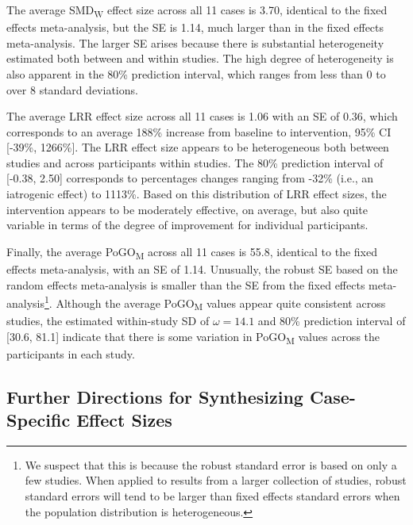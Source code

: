 \documentclass[
]{book}
\begin{document}
The average SMD\textsubscript{W} effect size across all 11 cases is 3.70, identical to the fixed effects meta-analysis, but the SE is 1.14, much larger than in the fixed effects meta-analysis. The larger SE arises because there is substantial heterogeneity estimated both between and within studies. The high degree of heterogeneity is also apparent in the 80\% prediction interval, which ranges from less than 0 to over 8 standard deviations.

The average LRR effect size across all 11 cases is 1.06 with an SE of 0.36, which corresponds to an average 188\% increase from baseline to intervention, 95\% CI {[}-39\%, 1266\%{]}. The LRR effect size appears to be heterogeneous both between studies and across participants within studies. The 80\% prediction interval of {[}-0.38, 2.50{]} corresponds to percentages changes ranging from -32\% (i.e., an iatrogenic effect) to 1113\%. Based on this distribution of LRR effect sizes, the intervention appears to be moderately effective, on average, but also quite variable in terms of the degree of improvement for individual participants.

Finally, the average PoGO\textsubscript{M} across all 11 cases is 55.8, identical to the fixed effects meta-analysis, with an SE of 1.14. Unusually, the robust SE based on the random effects meta-analysis is smaller than the SE from the fixed effects meta-analysis\footnote{We suspect that this is because the robust standard error is based on only a few studies. When applied to results from a larger collection of studies, robust standard errors will tend to be larger than fixed effects standard errors when the population distribution is heterogeneous.}. Although the average PoGO\textsubscript{M} values appear quite consistent across studies, the estimated within-study SD of \(\omega = 14.1\) and 80\% prediction interval of {[}30.6, 81.1{]} indicate that there is some variation in PoGO\textsubscript{M} values across the participants in each study.

\hypertarget{further-directions-for-synthesizing-case-specific-effect-sizes}{%
\subsection{Further Directions for Synthesizing Case-Specific Effect Sizes}\label{further-directions-for-synthesizing-case-specific-effect-sizes}}
\end{document}
